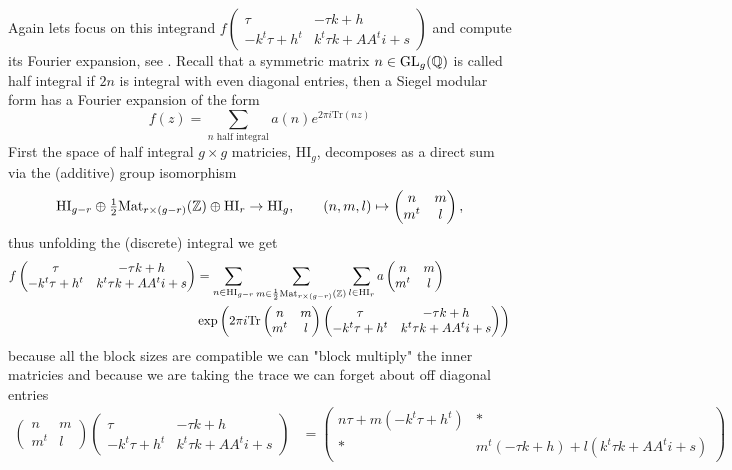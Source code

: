 Again lets focus on this integrand \(f\begin{pmatrix} \tau & -\tau k + h\\ -k^t \tau + h^t & k^t \tau k + A A^t i + s \end{pmatrix}\) and compute its Fourier expansion, see \cite[3.4]{bruinier123ModularForms2008}. Recall that a symmetric matrix \(n\in \GL_g(\Q)\) is called half integral if \(2n\) is integral with even diagonal entries, then a Siegel modular form has a Fourier expansion of the form
\[f(z) = \sum_{n \text{ half integral}}a(n) e^{2\pi i \mathrm{Tr}(nz)} \]
First the space of half integral \(g\times g\) matricies, \(\mathrm{HI}_g\), decomposes as a direct sum via the (additive) group isomorphism 
\[ \mathrm{HI}_{g-r} \oplus \tfrac{ 1}{ 2} \mathrm{Mat}_{ r\times (g-r)}(\Z) \oplus \mathrm{HI}_{r}\to\mathrm{HI}_g, \qquad (n, m, l)\mapsto \begin{pmatrix} n & m\\ m^t & l \end{pmatrix}, \]
thus unfolding the (discrete) integral we get 
\begin{align*}
    f\begin{pmatrix} \tau & -\tau k + h\\ -k^t \tau + h^t & k^t \tau k + A A^t i + s \end{pmatrix} &=   \sum_{n\in\mathrm{HI}_{g-r}} \sum_{m\in\frac{1}{2} \mathrm{Mat}_{ r\times (g-r)}(\Z)} \sum_{l\in\mathrm{HI}_{r}} a\begin{pmatrix} n & m\\ m^t & l \end{pmatrix} \\
    &\exp \left(2\pi i \mathrm{Tr} \begin{pmatrix} n & m\\ m^t & l \end{pmatrix}\begin{pmatrix} \tau & -\tau k + h\\ -k^t \tau + h^t & k^t \tau k + A A^t i + s \end{pmatrix} \right)  \\
\end{align*}
because all the block sizes are compatible we can "block multiply" the inner matricies and because we are taking the trace we can forget about off diagonal entries
\begin{align*}
    \begin{pmatrix} n & m\\ m^t & l \end{pmatrix}\begin{pmatrix} \tau & -\tau k + h\\ -k^t \tau + h^t & k^t \tau k + A A^t i + s \end{pmatrix} &= 
    \begin{pmatrix} n\tau + m(-k^t \tau + h^t ) & \ast\\ \ast & m^t(-\tau k + h) + l( k^t \tau k + A A^t i + s) \end{pmatrix}
\end{align*}
